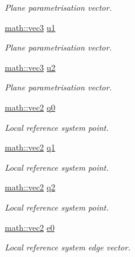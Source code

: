 \begin{DoxyCompactItemize}
\begin{DoxyCompactList}\small\item\em Plane parametrisation vector. \end{DoxyCompactList}\item 
\hyperlink{structphysim_1_1math_1_1vec3}{math\+::vec3} \hyperlink{classphysim_1_1geometric_1_1triangle_a16075f51dc838b9320ba3d87af6e7e35}{u1}
\begin{DoxyCompactList}\small\item\em Plane parametrisation vector. \end{DoxyCompactList}\item 
\hyperlink{structphysim_1_1math_1_1vec3}{math\+::vec3} \hyperlink{classphysim_1_1geometric_1_1triangle_a6b87ae44a5f773a727d77a965ca9d695}{u2}
\begin{DoxyCompactList}\small\item\em Plane parametrisation vector. \end{DoxyCompactList}\item 
\hyperlink{structphysim_1_1math_1_1vec2}{math\+::vec2} \hyperlink{classphysim_1_1geometric_1_1triangle_a3833e8f8b38f28edc60ac2fa28dc72f3}{q0}
\begin{DoxyCompactList}\small\item\em Local reference system point. \end{DoxyCompactList}\item 
\hyperlink{structphysim_1_1math_1_1vec2}{math\+::vec2} \hyperlink{classphysim_1_1geometric_1_1triangle_a85c4ea31680d2147c01c63edc6a9adbd}{q1}
\begin{DoxyCompactList}\small\item\em Local reference system point. \end{DoxyCompactList}\item 
\hyperlink{structphysim_1_1math_1_1vec2}{math\+::vec2} \hyperlink{classphysim_1_1geometric_1_1triangle_a0f90152f3bd59823b193adc1e9561a65}{q2}
\begin{DoxyCompactList}\small\item\em Local reference system point. \end{DoxyCompactList}\item 
\hyperlink{structphysim_1_1math_1_1vec2}{math\+::vec2} \hyperlink{classphysim_1_1geometric_1_1triangle_a5e9f0e86dc34f816805f161ce8e7ddf8}{e0}
\begin{DoxyCompactList}\small\item\em Local reference system edge vector. \end{DoxyCompactList}\item 

\end{DoxyCompactItemize}
